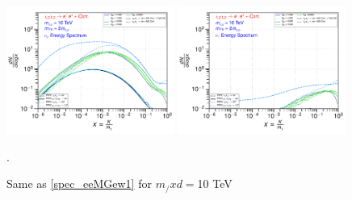 \documentclass[epj,nopacs,fleqn]{svjour}
\begin{document}
\begin{figure}[!b]
	\subfigure
	{ \includegraphics[width=0.49\textwidth]{Fig/xdxd_ee_eeZ_eveW/10_neutrinos_mu_ee_eeZ_eveW_10.pdf}}
	\subfigure
	{ \includegraphics[width=0.49\textwidth]{Fig/xdxd_ee_eeZ_eveW/10_neutrinos_tau_ee_eeZ_eveW_10.pdf}}
	\caption{Same as \ref{spec_eeMGew1} for  $m_/xd=$10 TeV}.
	\label{spec_eeMGew10}
\end{figure}


\clearpage
\end{document}
